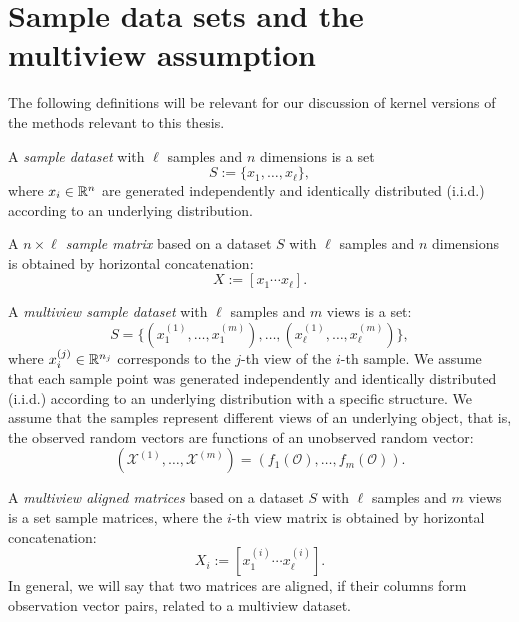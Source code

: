 \section{Sample data sets and the multiview assumption}
The following definitions will be relevant for our discussion of kernel versions of the methods relevant to this thesis.

\begin{definition}\label{def:notation:sample_dataset}
A \emph{sample dataset} with $\ell$ samples and $n$ dimensions is a set
$$ S := \lbrace x_1, \ldots, x_\ell \rbrace, $$
 where $x_i \in \mathbb{R}^n$ are  generated independently and identically distributed (i.i.d.) according to
an underlying distribution. 
\end{definition}

\begin{definition}\label{def:notation:sample_matrix}
A \emph{$n\times\ell$ sample matrix} based on a dataset $S$ with $\ell$ samples and $n$ dimensions is obtained by horizontal concatenation:
$$ X := \left[ x_1 \cdots x_\ell \right]. $$ 
\end{definition}

\begin{definition}\label{def:notation:multiview_dataset}
A \emph{multiview sample dataset} with $\ell$ samples and $m$ views is a set:
$$ S = \big\{ \left( x_1^{(1)},\ldots, x_1^{(m)} \right), \ldots, \left( x_\ell^{(1)}, \ldots, x_\ell^{(m)} \right) \big\}, $$ 
where $x_i^{(j)} \in \mathbb{R}^{n_j}$ corresponds to the $j$-th view of the $i$-th sample. 
We assume that each sample point was generated independently and identically distributed (i.i.d.) 
according to an underlying distribution with a specific structure. 
We assume that the samples represent different views of an underlying object, that is, the observed random vectors 
are functions of an unobserved random vector: 
  $$ \left( \mathcal{X}^{(1)}, \ldots, \mathcal{X}^{(m)} \right) = \left( f_1(\mathcal{O}), \ldots, f_m(\mathcal{O}) \right).$$  
\end{definition}

\begin{definition}\label{def:notation:multiview_aligned_matrices}
A \emph{multiview aligned matrices} based on a dataset $S$ with $\ell$ samples and $m$ views is a set sample matrices, where the $i$-th view
matrix is obtained by horizontal concatenation:
$$ X_i := \left[ x_1^{(i)} \cdots x_\ell^{(i)} \right]. $$
In general, we will say that two matrices are aligned, if their columns form observation vector pairs, related to a multiview dataset.
\end{definition}

